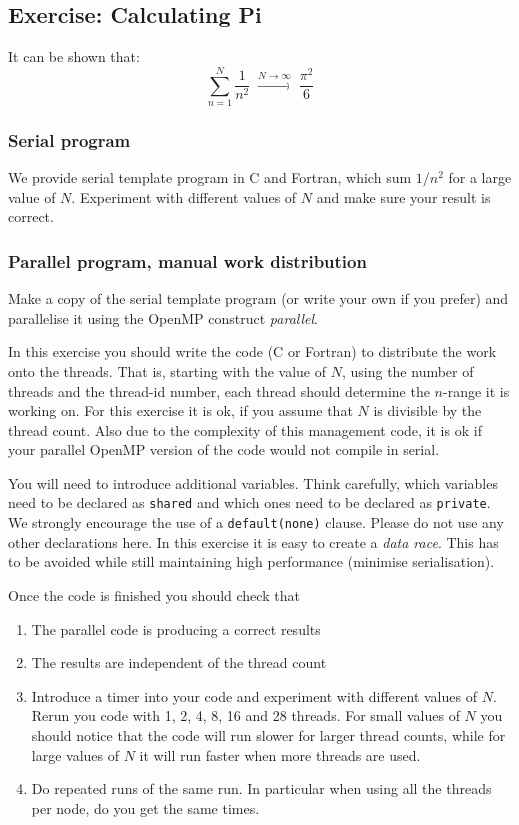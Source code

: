 \subsection{Exercise: Calculating Pi}
It can be shown that:
\begin{equation}
\sum_{n=1}^N \frac{1}{n^2} \;\stackrel{N \to \infty}{\longrightarrow}
\;\frac{\pi^2}{6}
\end{equation}

\subsubsection{Serial program}
We provide serial template program in C and Fortran, which sum $1/n^2$ for a large value of $N$.  Experiment with different values of $N$ and make sure your result is correct.

\subsubsection{Parallel program, manual work distribution}\label{PiManual}
Make a copy of the serial template program (or write your own if you prefer) and parallelise it using the OpenMP construct \textit{parallel}.  

In this exercise you should write the code (C or Fortran) to distribute the work onto the threads. That is, starting with the value of $N$, using the number of threads and the thread-id number, each thread should determine the $n$-range it is working on.  For this exercise it is ok, if you assume that $N$ is divisible by the thread count.  Also due to the complexity of this management code, it is ok if your parallel OpenMP version of the  code would not compile in serial.

You will need to introduce additional variables.  Think carefully, which variables need to be declared as \texttt{shared} and which ones need to be declared as \texttt{private}.  We strongly encourage the use of a \verb+default(none)+ clause.  Please do not use any other declarations here.  In this exercise it is easy to create a \textit{data race}.  This has to be avoided while still maintaining high performance (minimise serialisation).

Once the code is finished you should check that 
\begin{enumerate}
\item The parallel code is producing a correct results
\item The results are independent of the thread count
\item Introduce a timer into your code and experiment with different values of $N$.  Rerun you code with 1, 2, 4, 8, 16 and 28 threads.  For small values of $N$ you should notice that the code will run slower for larger thread counts, while for large values of $N$ it will run faster when more threads are used.
\item \label{runtimePi} Do repeated runs of the same run. In particular when using all the threads per  node, do you get the same times.
\end{enumerate}
